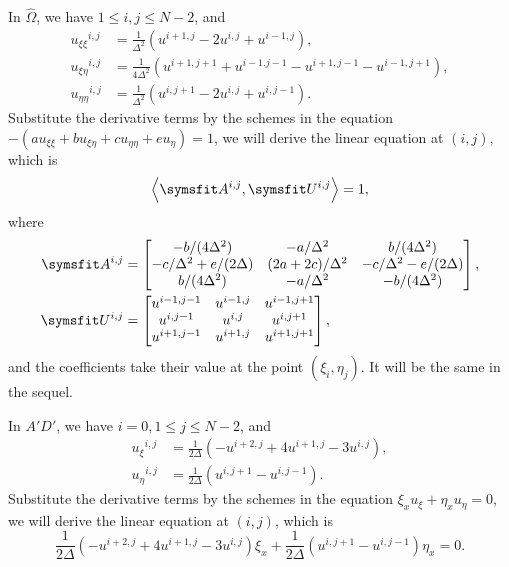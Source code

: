 \documentclass{assignment}[2019/10/15]
\newcommand{\lr}[3]{\left#1#3\right#2}
\newcommand{\Oh}{\hat{\Omega}}
\newcommand{\ux}{{u_\xi}}
\newcommand{\ue}{{u_\eta}}
\newcommand{\uxx}{{u_{\xi\xi}}}
\newcommand{\uxe}{{u_{\xi\eta}}}
\newcommand{\uee}{{u_{\eta\eta}}}
\begin{document}
    In $\Oh$, we have $1\leq i, j\leq N-2$, and
    \begin{equation}
        \begin{aligned}
            {\uxx}^{i, j} &= \frac{1}{\Delta^2}\left(u^{i+1, j}-2u^{i, j}+u^{i-1, j}\right),\\
            \uxe^{i, j} &= \frac{1}{4\Delta^2}\left(u^{i+1, j+1}+u^{i-1. j-1}-u^{i+1, j-1}-u^{i-1, j+1}\right),\\
            \uee^{i, j} &= \frac{1}{\Delta^2}\left(u^{i, j+1}-2u^{i, j}+u^{i, j-1}\right).
        \end{aligned}
    \end{equation}
    Substitute the derivative terms by the schemes in the equation $-(a\uxx+b\uxe+c\uee+e\ue) = 1$, we will derive the linear equation at $(i, j)$, which is
    \begin{equation}
        \left<\matr{A}^{i, j}, \matr{U}^{i, j}\right> = 1,
    \end{equation}
    where
    \begin{equation}
        \begin{aligned}
            \matr{A}^{i, j}&=
            \begin{bmatrix}
                -b/(4\Delta^2) & -a/\Delta^2 & b/(4\Delta^2)\\
                -c/\Delta^2+e/(2\Delta) & (2a+2c)/\Delta^2 & -c/\Delta^2-e/(2\Delta)\\
                b/(4\Delta^2) & -a/\Delta^2 & -b/(4\Delta^2)
            \end{bmatrix},\\
            \matr{U}^{i, j}&=
            \begin{bmatrix}
                u^{i-1, j-1} & u^{i-1, j} & u^{i-1, j+1}\\
                u^{i, j-1} & u^{i, j} & u^{i, j+1}\\
                u^{i+1, j-1} & u^{i+1, j} & u^{i+1, j+1}
            \end{bmatrix},
        \end{aligned}
    \end{equation}
    and the coefficients take their value at the point $(\xi_i, \eta_j)$. It will be the same in the sequel.

    In $A'D'$, we have $i = 0, 1\leq j\leq N-2$, and
    \begin{equation}
        \begin{aligned}
            \ux^{i, j} &= \frac{1}{2\Delta}\lr(){-u^{i+2, j}+4u^{i+1, j}-3u^{i, j}},\\
            \ue^{i, j} &= \frac{1}{2\Delta}\lr(){u^{i, j+1}-u^{i, j-1}}.
        \end{aligned}
    \end{equation}
    Substitute the derivative terms by the schemes in the equation $\xi_x\ux+\eta_x\ue = 0$, we will derive the linear equation at $(i, j)$, which is
    \begin{equation}
        \frac{1}{2\Delta}\lr(){-u^{i+2, j}+4u^{i+1, j}-3u^{i, j}}\xi_x+\frac{1}{2\Delta}\lr(){u^{i, j+1}-u^{i, j-1}}\eta_x = 0.
    \end{equation}
\end{document}
